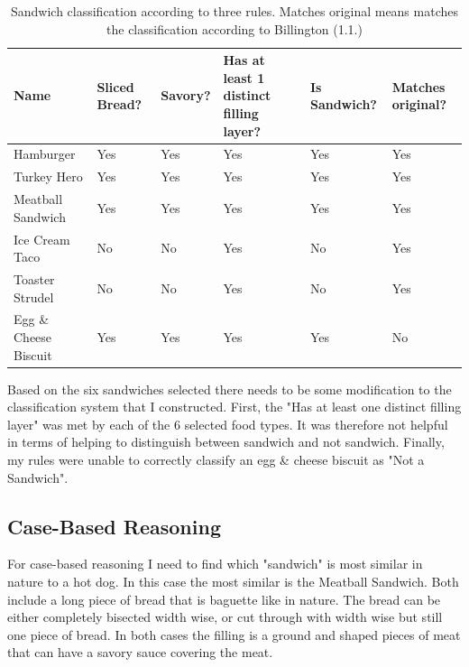 \documentclass[
	letterpaper, %
]{jdf}
\begin{document}
\begin{table}[h]
    \small
    \centering
    \caption{Sandwich classification according to three rules. Matches original means matches the classification according to Billington (1.1.)}
    \begin{tabular}{l|l|l|p{2 cm}|l|p{1.75 cm}}
        \textbf{Name} & \textbf{Sliced Bread?} & \textbf{Savory?} & \textbf{Has at least 1 distinct filling layer?} & \textbf{Is Sandwich?} & \textbf{Matches original?}\\
        \toprule[0.5pt]
        Hamburger & Yes & Yes & Yes & Yes & Yes\\
        Turkey Hero & Yes & Yes & Yes & Yes & Yes\\
        Meatball Sandwich & Yes & Yes & Yes & Yes & Yes\\
        Ice Cream Taco & No & No & Yes & No & Yes\\
        Toaster Strudel & No & No & Yes & No & Yes\\
        Egg \& Cheese Biscuit & Yes & Yes & Yes & Yes & No\\
    \end{tabular}
    \label{tab:my_label}
\end{table}

Based on the six sandwiches selected there needs to be some modification to the classification system that I constructed. First, the "Has at least one distinct filling layer" was met by each of the 6 selected food types. It was therefore not helpful in terms of helping to distinguish between sandwich and not sandwich. Finally, my rules were unable to correctly classify an egg \& cheese biscuit as "Not a Sandwich".

\subsection{Case-Based Reasoning}
For case-based reasoning I need to find which "sandwich" is most similar in nature to a hot dog. In this case the most similar is the Meatball Sandwich. Both include a long piece of bread that is baguette like in nature. The bread can be either completely bisected width wise, or cut through with width wise but still one piece of bread. In both cases the filling is a ground and shaped pieces of meat that can have a savory sauce covering the meat.
\end{document}
